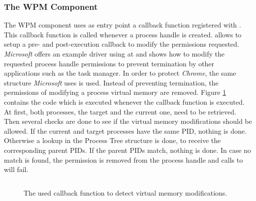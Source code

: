 \subsubsection{The WPM Component}
The \gls{WPM} component uses as entry point a callback function registered with . This callback function is called whenever a process handle is created.  allows to setup a pre- and post-execution callback to modify the permissions requested. \emph{Microsoft} offers an example driver using  at \cite{github_obcallback} and shows how to modify the requested process handle permissions to prevent termination by other applications such as the task manager. In order to protect \emph{Chrome}, the same structure \emph{Microsoft} uses is used. Instead of preventing termination, the permissions of modifying a process virtual memory are removed. Figure \ref{code:code7} contains the code which is executed whenever the callback function is executed. At first, both processes, the target and the current one, need to be retrieved. Then several checks are done to see if the virtual memory modifications should be allowed. If the current and target processes have the same \gls{PID}, nothing is done. Otherwise a lookup in the Process Tree structure is done, to receive the corresponding parent \glspl{PID}. If the parent \glspl{PID} match, nothing is done. In case no match is found, the permission  is removed from the process handle and calls to  will fail.
\begin{figure}[h]
\inputminted[breakanywhere, breaklines,fontsize=\scriptsize, frame=single, mathescape, linenos, numbersep=5pt, numbersep=5pt, xleftmargin=0pt]{c}{sections/implementation/code7.c}
\caption{The used callback function to detect virtual memory modifications.}
\label{code:code7}
\end{figure}
